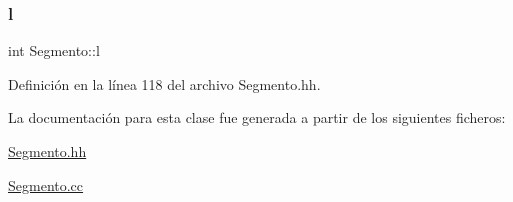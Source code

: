 \subsubsection{\texorpdfstring{l}{l}}
{\footnotesize\ttfamily int Segmento\+::l\hspace{0.3cm}{\ttfamily [private]}}



Definición en la línea 118 del archivo Segmento.\+hh.



La documentación para esta clase fue generada a partir de los siguientes ficheros\+:\begin{DoxyCompactItemize}
\item 
\hyperlink{_segmento_8hh}{Segmento.\+hh}\item 
\hyperlink{_segmento_8cc}{Segmento.\+cc}\end{DoxyCompactItemize}
